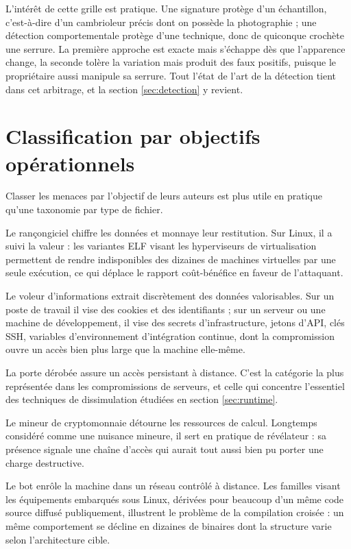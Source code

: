L'intérêt de cette grille est pratique. Une signature protège d'un échantillon, c'est-à-dire d'un cambrioleur précis dont on possède la photographie ; une détection comportementale protège d'une technique, donc de quiconque crochète une serrure. La première approche est exacte mais s'échappe dès que l'apparence change, la seconde tolère la variation mais produit des faux positifs, puisque le propriétaire aussi manipule sa serrure. Tout l'état de l'art de la détection tient dans cet arbitrage, et la section \ref{sec:detection} y revient.

\section{Classification par objectifs opérationnels}

Classer les menaces par l'objectif de leurs auteurs est plus utile en pratique qu'une taxonomie par type de fichier.

Le rançongiciel chiffre les données et monnaye leur restitution. Sur Linux, il a suivi la valeur : les variantes ELF visant les hyperviseurs de virtualisation permettent de rendre indisponibles des dizaines de machines virtuelles par une seule exécution, ce qui déplace le rapport coût-bénéfice en faveur de l'attaquant.

Le voleur d'informations extrait discrètement des données valorisables. Sur un poste de travail il vise des cookies et des identifiants ; sur un serveur ou une machine de développement, il vise des secrets d'infrastructure, jetons d'API, clés SSH, variables d'environnement d'intégration continue, dont la compromission ouvre un accès bien plus large que la machine elle-même.

La porte dérobée assure un accès persistant à distance. C'est la catégorie la plus représentée dans les compromissions de serveurs, et celle qui concentre l'essentiel des techniques de dissimulation étudiées en section \ref{sec:runtime}.

Le mineur de cryptomonnaie détourne les ressources de calcul. Longtemps considéré comme une nuisance mineure, il sert en pratique de révélateur : sa présence signale une chaîne d'accès qui aurait tout aussi bien pu porter une charge destructive.

Le bot enrôle la machine dans un réseau contrôlé à distance. Les familles visant les équipements embarqués sous Linux, dérivées pour beaucoup d'un même code source diffusé publiquement, illustrent le problème de la compilation croisée : un même comportement se décline en dizaines de binaires dont la structure varie selon l'architecture cible.

